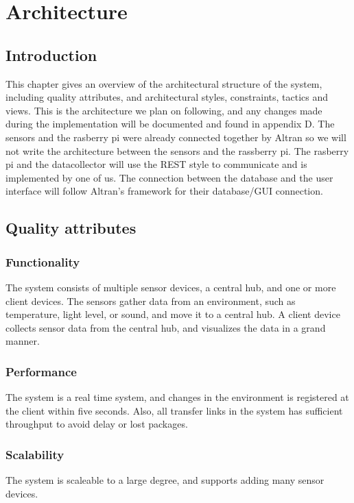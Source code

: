 \documentclass[../document.tex]{subfiles}
\begin{document}
\section{Architecture}
\label{architecture}
\subsection{Introduction}
This chapter gives an overview of the architectural structure of the system, including quality attributes, and architectural styles, constraints, tactics and views. This is the architecture we plan on following, and any changes made during the implementation will be documented and found in appendix D.  The sensors and the rasberry pi were already connected together by Altran so we will not write the architecture between the sensors and the rassberry pi. The rasberry pi and the datacollector will use the REST style to communicate and is implemented by one of us. The connection between the database and the user interface will follow Altran's framework for their database/GUI connection.

\subsection{Quality attributes}
\subsubsection{Functionality}
The system consists of multiple sensor devices, a central hub, and one or more client devices. The sensors gather data from an environment, such as temperature, light level, or sound, and move it to a central hub. A client device collects sensor data from the central hub, and visualizes the data in a grand manner.

\subsubsection{Performance}
The system is a real time system, and changes in the environment is registered at the client within five seconds. Also, all transfer links in the system has sufficient throughput to avoid delay or lost packages.

\subsubsection{Scalability}
The system is scaleable to a large degree, and supports adding many sensor devices.
\end{document}

